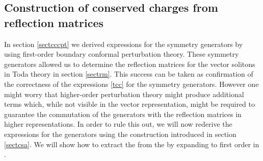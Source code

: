 \documentclass[a4paper,12pt]{article}
\numberwithin{equation}{section}
\begin{document}
\subsection{Construction of conserved charges from reflection
matrices\label{sectccrm}}

In section \ref{sectcccpt} we derived expressions for the symmetry
generators \coordHE{} by using first-order boundary conformal
perturbation theory. These symmetry generators allowed us to
determine the reflection matrices for the vector solitons in
\coordHE{} Toda theory in section \ref{sectrm}. This success can
be taken as confirmation of the correctness of the expressions
\eqref{tcc} for the symmetry generators. However one might worry
that higher-order perturbation theory might produce additional
terms which, while not visible in the vector representation, might
be required to guarantee the commutation of the generators with
the reflection matrices in higher representations. In order to
rule this out, we will now rederive the expressions for the
generators \coordHE{} using the construction introduced in
section \ref{sectcsa}. We will show how to extract the \coordHE{}
from the \coordHE{} by expanding to first order in
\coordHE{}.
\end{document}
